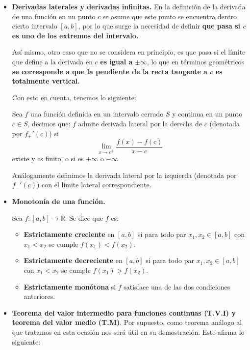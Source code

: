 \begin{itemize}
	\item \textbf{Derivadas laterales y derivadas infinitas.} En la definición de la derivada de una función en un punto \(c\) se asume que este punto se encuentra dentro cierto intervalo \([a,b]\), por lo que surge la necesidad de definir \textbf{que pasa si \(c\) es uno de los extremos del intervalo.}
	
	Así mismo, otro caso que no se considera en principio, es que pasa si el límite que define a la derivada en \(c\) \textbf{es igual a} \(\pm \infty\), lo que en términos geométricos \textbf{se corresponde a que la pendiente de la recta tangente a \(c\) es totalmente vertical.}
	
	Con esto en cuenta, tenemos lo siguiente:
	\begin{definicion}
	    Sea \(f\) una función definida en un intervalo cerrado \(S\) y continua en un punto \(c \in S\), decimos que: 
		\(f\) admite derivada lateral por la derecha de \(c\) (denotada por \(f_{+}'(c)\)) si \[\lim\limits_{x \to c^+} \frac{f(x) - f(c) }{x-c}\] 
		existe y es finito, o si es \(+\infty\) o \(-\infty\)
		
		Análogamente definimos la derivada lateral por la izquierda (denotada por \(f_{-}'(c)\)) con el limite lateral correspondiente.
	\end{definicion}
	
	\item \textbf{Monotonía de una función. }
	\begin{definicion}
	    Sea $f : [a, b] \to \mathbb{R}$. Se dice que $f$ es:
		\begin{itemize}
			\item \textbf{Estrictamente creciente} en $[a, b]$ si para todo par $x_1, x_2 \in [a, b]$ con $x_1 < x_2$ se cumple $f(x_1) < f(x_2)$.
			\item \textbf{Estrictamente decreciente} en $[a, b]$ si para todo par $x_1, x_2 \in [a, b]$ con $x_1 < x_2$ se cumple $f(x_1) > f(x_2)$.
			\item \textbf{Estrictamente monótona} si $f$ satisface una de las dos condiciones anteriores.
		\end{itemize}
	\end{definicion}
	
	
	\item \textbf{Teorema del valor intermedio para funciones continuas (T.V.I) y teorema del valor medio (T.M)}. Por supuesto, como teorema análogo al que tratamos en esta ocasión nos será útil en su demostración. Este afirma lo siguiente:
	

\end{itemize}
